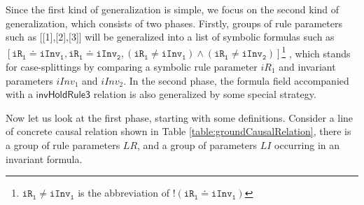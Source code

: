 \documentclass[final]{IEEEtran}
\def \eqc {\doteq }
\def \iInv {iInv}
\def \iR {iR}
\begin{document}
Since the first kind of generalization is simple, we focus on the second kind of generalization, which consists of two phases.
Firstly, groups of rule parameters  such as [[1],[2],[3]] will be generalized into a list of  symbolic formulas  such as $[\mathtt{\iR_1} \eqc \mathtt{\iInv_1},\mathtt{\iR_1} \eqc \mathtt{\iInv_2},  (\mathtt{\iR_1} \ne \mathtt{\iInv_1}) \wedge  (\mathtt{\iR_1} \ne \mathtt{\iInv_2})] $\footnote{$\mathtt{\iR_1} \ne \mathtt{\iInv_1}$ is the abbreviation of $!(\mathtt{\iR_1} \eqc \mathtt{\iInv_1})$} , which  stands for case-splittings  by comparing  a symbolic rule parameter $iR_1$ and invariant parameters $\iInv_1$ and $\iInv_2$. In the second phase, the formula field accompanied with a $\mathsf{invHoldRule3}$ relation is also  generalized by some special strategy.  %

Now let us look at the first phase, starting with some definitions.
Consider a line of concrete causal relation shown in Table \ref{table:groundCausalRelation}, there is a group of rule parameters $LR$, and a group of parameters $LI$ occurring in an  invariant formula.
\end{document}
